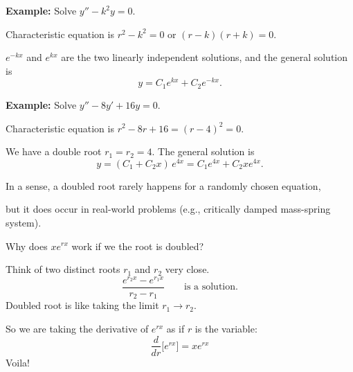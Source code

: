 \documentclass[10pt,aspectratio=169]{beamer}
\begin{document}
\begin{frame}

\textbf{Example:}
Solve
\quad $y'' - k^2 y = 0$.

\medskip
\pause

Characteristic equation is $r^2 - k^2 = 0$ or $(r-k)(r+k) = 0$.

\medskip
\pause

\wthus $e^{-k x}$ and $e^{kx}$ are the two
linearly independent solutions,
\pause
and the general solution is
\[
y = C_1 e^{kx} + C_2e^{-kx} .
\]

\medskip
\pause

\textbf{Example:}
Solve \quad
$y'' -8 y' + 16 y = 0$.

\medskip
\pause

Characteristic equation is $r^2 - 8 r + 16 = {(r-4)}^2 = 0$.

\medskip
\pause

We have
a double root $r_1 = r_2 = 4$.
\medskip
The general solution is
\[
y = (C_1 + C_2 x)\, e^{4 x} = C_1 e^{4x} + C_2 x e^{4x} .
\]
\end{frame}

\begin{frame}
In a sense, a doubled root rarely happens for a randomly chosen equation,

but it does occur in real-world problems
(e.g., critically damped mass-spring system).

\medskip
\pause

Why does $xe^{rx}$ work if we the root is doubled?

\medskip
\pause

Think of two distinct roots $r_1$ and $r_2$ very close.
\pause
\[
\frac{e^{r_2 x} - e^{r_1 x}}{r_2 - r_1}
\qquad \text{is a solution.}
\]
\pause
Doubled root is like taking the limit
$r_1 \to r_2$.

\medskip
\pause

So we are taking the derivative of $e^{rx}$ as if $r$ is the variable:
\[
\frac{d}{dr} \bigl[ e^{rx} \bigr] = x e^{rx}
\]
\pause
Voila!

\end{frame}
\end{document}
